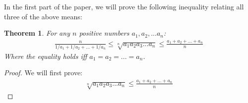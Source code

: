 \documentclass[12pt]{extreport}
\newtheorem*{thm}{Theorem}
\begin{document}
In the first part of the paper, we will prove the following inequality relating all three of the above means: 
\begin{thm}
For any $n$ positive numbers $a_1, a_2, ... a_n$: 
\begin{align*}
\frac{n}{1/a_1 + 1/a_2 + ... + 1/a_n} \leq \sqrt[n]{a_1 a_2 a_3 ... a_n} \leq \frac{a_1 + a_2 + ... + a_n}{n}
\end{align*}
Where the equality holds iff $a_1 = a_2 = ... = a_n$.
\end{thm}

\begin{proof}
We will first prove:
\begin{align*}
\sqrt[n]{a_1 a_2 a_3 ... a_n} \leq \frac{a_1 + a_2 + ... + a_n}{n}
\end{align*}


\end{proof}
\end{document}
